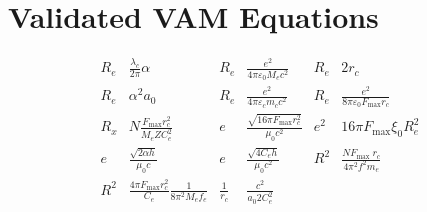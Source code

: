     \section*{Validated VAM Equations}\label{sec:validated-vam-equations}
    \begin{align*}
        R_e & \frac{\lambda_c}{2 \pi} \alpha & R_e & \frac{e^2}{4 \pi \varepsilon_0 M_e c^2} & R_e & 2 r_c \\
        R_e & \alpha^2 a_0 & R_e & \frac{e^2}{4 \pi \varepsilon_c m_c c^2} & R_e & \frac{e^2}{8 \pi \varepsilon_0 F_{\text{max}} r_c} \\
        R_x & N \frac{F_{\max} r_c^2}{M_e Z C_e^2} & e & \frac{\sqrt{16 \pi F_{\max} r_c^2}}{\mu_0 c^2} & e^2 & 16 \pi F_{\max} \xi_0 R_e^2 \\
        e & \frac{\sqrt{2 \alpha h}}{\mu_0 c} & e & \frac{\sqrt{4 C_e h}}{\mu_0 c^2} & R^2 & \frac{N F_{\text {max }} r_c}{4 \pi^2 f^2 m_e} \\
        R^2 & \frac{4 \pi F_{\text{max}} r_c^2}{C_e} \frac{1}{8 \pi^2 M_e f_e} & \frac{1}{r_c} & \frac{c^2}{a_0 2 C_e^2} &
    \end{align*}

